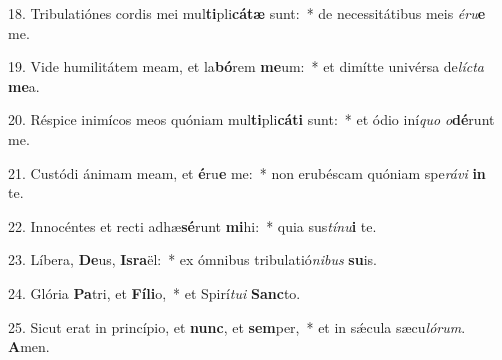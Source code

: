 18. Tribulatiónes cordis mei mul\textbf{ti}pli\textbf{cá}\textbf{tæ} sunt:~*  de necessitátibus meis \textit{é}\textit{ru}\textbf{e} me.\

19. Vide humilitátem meam, et la\textbf{bó}rem \textbf{me}um:~*  et dimítte univérsa de\textit{líc}\textit{ta} \textbf{me}a.\

20. Réspice inimícos meos quóniam mul\textbf{ti}pli\textbf{cá}\textbf{ti} sunt:~*  et ódio iní\textit{quo} \textit{o}\textbf{dé}runt me.\

21. Custódi ánimam meam, et \textbf{é}ru\textbf{e} me:~*  non erubéscam quóniam spe\textit{rá}\textit{vi} \textbf{in} te.\

22. Innocéntes et recti adhæ\textbf{sé}runt \textbf{mi}hi:~*  quia sus\textit{tí}\textit{nu}\textbf{i} te.\

23. Líbera, \textbf{De}us, \textbf{Is}\textbf{ra}ël:~*  ex ómnibus tribulatió\textit{ni}\textit{bus} \textbf{su}is.\

24. Glória \textbf{Pa}tri, et \textbf{Fí}\textbf{li}o,~*  et Spirí\textit{tu}\textit{i} \textbf{Sanc}to.\

25. Sicut erat in princípio, et \textbf{nunc}, et \textbf{sem}per,~*  et in sǽcula sæcu\textit{ló}\textit{rum}. \textbf{A}men.\

